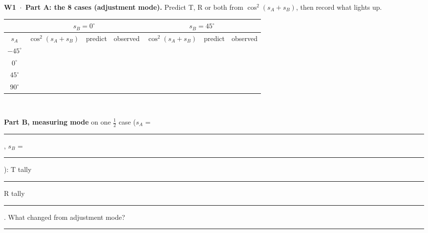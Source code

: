 \documentclass[a4paper,11pt]{article}
\newcommand{\blank}[1]{\rule{#1}{0.4pt}}
\begin{document}
\vspace{4pt}
\textbf{W1 \,$\cdot$\, Part A: the 8 cases (adjustment mode).}
{\small Predict T, R or both from $\cos^2(s_A+s_B)$, then record what lights up.}\\[2pt]
{\small
\begin{tabular}{|c|c|c|c|c|c|c|}\hline
 & \multicolumn{3}{c|}{$s_B = 0^\circ$} & \multicolumn{3}{c|}{$s_B = 45^\circ$} \\ \hline
$s_A$ & $\cos^2(s_A+s_B)$ & predict & observed & $\cos^2(s_A+s_B)$ & predict & observed \\ \hline
\rule[-1.7mm]{0pt}{5.4mm}$-45^\circ$ & & & & & & \\ \hline
\rule[-1.7mm]{0pt}{5.4mm}$0^\circ$   & & & & & & \\ \hline
\rule[-1.7mm]{0pt}{5.4mm}$45^\circ$  & & & & & & \\ \hline
\rule[-1.7mm]{0pt}{5.4mm}$90^\circ$  & & & & & & \\ \hline
\end{tabular}}\\[3pt]
{\small \textbf{Part B, measuring mode} on one $\tfrac12$ case ($s_A$ = \blank{0.9cm},
$s_B$ = \blank{0.9cm}): T tally \blank{2cm} R tally \blank{2cm}.
What changed from adjustment mode? \blank{4.6cm}}
\end{document}
